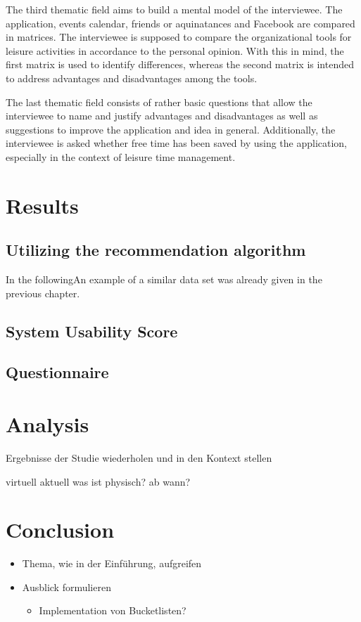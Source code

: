 \documentclass[12pt,numbers=noenddot,parskip,bibliography=totocnumbered,listof=totocnumbered,draft]{scrreprt}
\begin{document}
The third thematic field aims to build a mental model of the interviewee. The application, events calendar, friends or aquinatances and Facebook are compared in matrices. The interviewee is supposed to compare the organizational tools for leisure activities in accordance to the personal opinion. With this in mind, the first matrix is used to identify differences, whereas the second matrix is intended to address advantages and disadvantages among the tools.

The last thematic field consists of rather basic questions that allow the interviewee to name and justify advantages and disadvantages as well as suggestions to improve the application and idea in general. Additionally, the interviewee is asked whether free time has been saved by using the application, especially in the context of leisure time management.

\chapter{Results}


\section{Utilizing the recommendation algorithm}In the followingAn example of a similar data set was already given in the previous chapter. 

\section{System Usability Score}

\section{Questionnaire}

\chapter{Analysis}
Ergebnisse der Studie wiederholen und in den Kontext stellen

virtuell aktuell was ist physisch? ab wann?

\chapter{Conclusion}
\begin{itemize} 
	\item Thema, wie in der Einführung, aufgreifen
	\item Ausblick formulieren
	\begin{itemize} 
		\item Implementation von Bucketlisten?
	\end{itemize} 
\end{itemize} 
\end{document}

